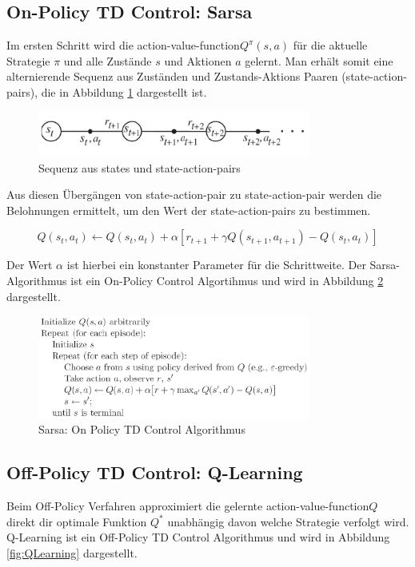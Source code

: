 \documentclass[10pt]{scrartcl}
\begin{document}
\subsection{On-Policy TD Control: Sarsa}
Im ersten Schritt wird die \glqq action-value-function\grqq\xspace $Q^{\pi}(s,a)$ für die aktuelle Strategie $\pi$ und alle Zustände $s$ und Aktionen $a$ gelernt. Man erhält somit eine alternierende Sequenz aus Zuständen und Zustands-Aktions Paaren (state-action-pairs), die in Abbildung \ref{fig:SA-Pairs} dargestellt ist.

\begin{figure}[htbp]
	\centering	\includegraphics[width=0.8\textwidth]{Bilder/OnPolicy.png}
	\caption{Sequenz aus states und state-action-pairs}
	\label{fig:SA-Pairs}
\end{figure}

Aus diesen Übergängen von state-action-pair zu state-action-pair werden die Belohnungen ermittelt, um den Wert der state-action-pairs zu bestimmen.

\begin{equation}
Q(s_{t},a_{t}) \leftarrow Q(s_{t},a_{t}) + \alpha [r_{t+1} + \gamma Q(s_{t+1},a_{t+1}) - Q(s_{t},a_{t})]
\end{equation}

Der Wert $\alpha$ ist hierbei ein konstanter Parameter für die Schrittweite. Der Sarsa-Algorithmus ist ein On-Policy Control Algortihmus und wird in Abbildung \ref{fig:Sarsa} dargestellt.

\begin{figure}[htbp]
	\centering	\includegraphics[width=0.8\textwidth]{Bilder/Q-Learning.png}
	\caption{Sarsa: On Policy TD Control Algorithmus}
	\label{fig:Sarsa}
\end{figure}

\subsection{Off-Policy TD Control: Q-Learning}
Beim Off-Policy Verfahren approximiert die gelernte \glqq action-value-function\grqq\xspace $Q$  direkt dir optimale Funktion $Q^{*}$ unabhängig davon welche Strategie verfolgt wird. Q-Learning ist ein Off-Policy TD Control Algorithmus und wird in Abbildung \ref{fig:QLearning} dargestellt.
 
\end{document}

